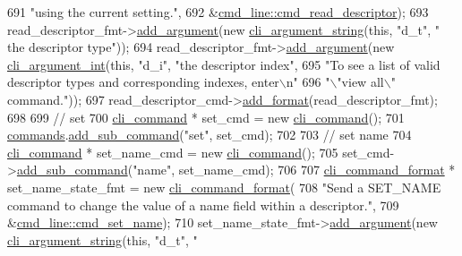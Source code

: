 \begin{DoxyCode}
691         \textcolor{stringliteral}{"using the current setting."},
692         &\hyperlink{classcmd__line_ac12332d0c28537a20fbb567ac40e40b0}{cmd\_line::cmd\_read\_descriptor});
693     read\_descriptor\_fmt->\hyperlink{classcli__command__format_ac3fc6d13a227c195d5ee6f7b78eba9cd}{add\_argument}(\textcolor{keyword}{new} \hyperlink{classcli__argument__string}{cli\_argument\_string}(\textcolor{keyword}{this}, \textcolor{stringliteral}{"d\_t"}, \textcolor{stringliteral}{"
      the descriptor type"}));
694     read\_descriptor\_fmt->\hyperlink{classcli__command__format_ac3fc6d13a227c195d5ee6f7b78eba9cd}{add\_argument}(\textcolor{keyword}{new} \hyperlink{classcli__argument__int}{cli\_argument\_int}(\textcolor{keyword}{this}, \textcolor{stringliteral}{"d\_i"}, \textcolor{stringliteral}{"the
       descriptor index"},
695                                                            \textcolor{stringliteral}{"To see a list of valid descriptor types and
       corresponding indexes, enter\(\backslash\)n"}
696                                                            \textcolor{stringliteral}{"\(\backslash\)"view all\(\backslash\)" command."}));
697     read\_descriptor\_cmd->\hyperlink{classcli__command_aa9ec38e761644d946f8db2b920e39921}{add\_format}(read\_descriptor\_fmt);
698 
699     \textcolor{comment}{// set}
700     \hyperlink{classcli__command}{cli\_command} * set\_cmd = \textcolor{keyword}{new} \hyperlink{classcli__command}{cli\_command}();
701     \hyperlink{classcmd__line_ae4fea670c2fdd2b60f7b5b6ad6fbaf1e}{commands}.\hyperlink{classcli__command_aa73a67e8ebb6facd4b40ced66279b226}{add\_sub\_command}(\textcolor{stringliteral}{"set"}, set\_cmd);
702 
703     \textcolor{comment}{// set name}
704     \hyperlink{classcli__command}{cli\_command} * set\_name\_cmd = \textcolor{keyword}{new} \hyperlink{classcli__command}{cli\_command}();
705     set\_cmd->\hyperlink{classcli__command_aa73a67e8ebb6facd4b40ced66279b226}{add\_sub\_command}(\textcolor{stringliteral}{"name"}, set\_name\_cmd);
706 
707     \hyperlink{classcli__command__format}{cli\_command\_format} * set\_name\_state\_fmt = \textcolor{keyword}{new} 
      \hyperlink{classcli__command__format}{cli\_command\_format}(
708         \textcolor{stringliteral}{"Send a SET\_NAME command to change the value of a name field within a descriptor."},
709         &\hyperlink{classcmd__line_a4181414fb1570d41849446767ff1b544}{cmd\_line::cmd\_set\_name});
710     set\_name\_state\_fmt->\hyperlink{classcli__command__format_ac3fc6d13a227c195d5ee6f7b78eba9cd}{add\_argument}(\textcolor{keyword}{new} \hyperlink{classcli__argument__string}{cli\_argument\_string}(\textcolor{keyword}{this}, \textcolor{stringliteral}{"d\_t"}, \textcolor{stringliteral}{"
}
\end{DoxyCode}
